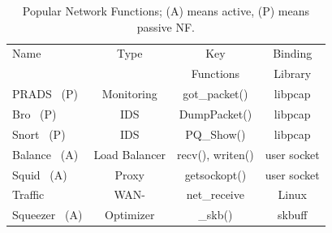 \begin{table}[t]\label{middleboxextension} 
\centering
 
\small
\begin{tabular} {|l |c |c |c|}
\hline

      Name          	  &         Type           & Key        	 &      Binding   \\
                      	  &                        &  Functions          &       Library  \\ \hline
PRADS~\cite{prads} (P) 	  &      Monitoring        &    got\_packet()      & libpcap   \\ \hline
Bro~\cite{bro} (P)      	  &      IDS               &   DumpPacket()      & libpcap   \\ \hline
Snort~\cite{snort} (P)  	  &        IDS         &    PQ\_Show()          & libpcap \\ \hline 
Balance~\cite{balance} (A)	  &      Load Balancer     &    recv(), writen()       &user socket\\ \hline
Squid~\cite{squid} (A) 	  &        Proxy           &  getsockopt()        & user socket  \\ \hline
Traffic   		  &    WAN-                &     net\_receive       &Linux  \\ 
Squeezer~\cite{tsqueezer} (A)&Optimizer &\_skb()   & skbuff \\ \hline


\end{tabular}
\caption{\small Popular Network Functions; (A) means active, (P) means passive NF. }\label{nfhook}
\end{table}






% 
